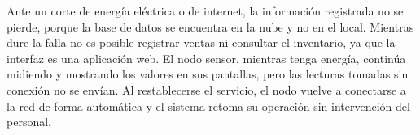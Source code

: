 

Ante un corte de energía eléctrica o de internet, la información registrada no se pierde, porque la base de datos se encuentra en la nube y no en el local. Mientras dure la falla no es posible registrar ventas ni consultar el inventario, ya que la interfaz es una aplicación web. El nodo sensor, mientras tenga energía, continúa midiendo y mostrando los valores en sus pantallas, pero las lecturas tomadas sin conexión no se envían. Al restablecerse el servicio, el nodo vuelve a conectarse a la red de forma automática y el sistema retoma su operación sin intervención del personal.



